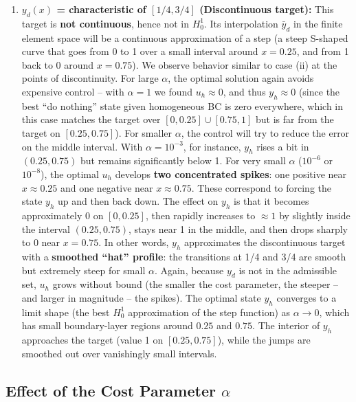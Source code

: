\documentclass[a4paper,10pt]{article}
\begin{document}
\begin{enumerate}
	\item \textbf{\(y_d(x)\) = characteristic of \([1/4,3/4]\) (Discontinuous target):} This target is \textbf{not continuous}, hence not in \(H^1_0\). Its interpolation \(\bar y_d\) in the finite element space will be a continuous approximation of a step (a steep S-shaped curve that goes from 0 to 1 over a small interval around \(x=0.25\), and from 1 back to 0 around \(x=0.75\)). We observe behavior similar to case (ii) at the points of discontinuity. For large \(\alpha\), the optimal solution again avoids expensive control – with \(\alpha=1\) we found \(u_h\approx 0\), and thus \(y_h\approx 0\) (since the best “do nothing” state given homogeneous BC is zero everywhere, which in this case matches the target over \([0,0.25]\cup[0.75,1]\) but is far from the target on \([0.25,0.75]\)). For smaller \(\alpha\), the control will try to reduce the error on the middle interval. With \(\alpha=10^{-3}\), for instance, \(y_h\) rises a bit in \((0.25,0.75)\) but remains significantly below 1. For very small \(\alpha\) (\(10^{-6}\) or \(10^{-8}\)), the optimal \(u_h\) develops \textbf{two concentrated spikes}: one positive near \(x\approx 0.25\) and one negative near \(x\approx 0.75\). These correspond to forcing the state \(y_h\) up and then back down. The effect on \(y_h\) is that it becomes approximately 0 on \([0,0.25]\), then rapidly increases to \(\approx 1\) by slightly inside the interval \((0.25,0.75)\), stays near 1 in the middle, and then drops sharply to 0 near \(x=0.75\). In other words, \(y_h\) approximates the discontinuous target with a \textbf{smoothed “hat” profile}: the transitions at 1/4 and 3/4 are smooth but extremely steep for small \(\alpha\). Again, because \(y_d\) is not in the admissible set, \(u_h\) grows without bound (the smaller the cost parameter, the steeper – and larger in magnitude – the spikes). The optimal state \(y_h\) converges to a limit shape (the best \(H^1_0\) approximation of the step function) as \(\alpha\to 0\), which has small boundary-layer regions around \(0.25\) and \(0.75\). The interior of \(y_h\) approaches the target (value 1 on \([0.25,0.75]\)), while the jumps are smoothed out over vanishingly small intervals.
\end{enumerate}

\subsection{Effect of the Cost Parameter \texorpdfstring{\(\alpha\)}{alpha}}
\end{document}
